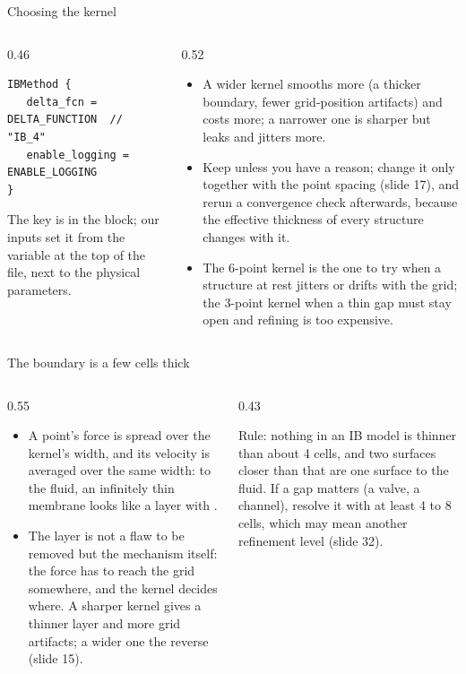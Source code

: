 \documentclass[aspectratio=169,11pt]{beamer}
\begin{document}
\begin{frame}[fragile]{Choosing the kernel}
\begin{columns}[T,onlytextwidth]
\begin{column}{0.46\textwidth}
\begin{lstlisting}[style=input]
IBMethod {
   delta_fcn = DELTA_FUNCTION  // "IB_4"
   enable_logging = ENABLE_LOGGING
}
\end{lstlisting}
\small The key is  in the  block; our inputs set it from the variable  at the top of the file, next to the physical parameters.
\end{column}
\begin{column}{0.52\textwidth}
\small
\begin{itemize}
  \item A wider kernel smooths more (a thicker boundary, fewer grid-position artifacts) and costs more; a narrower one is sharper but leaks and jitters more.
  \item Keep  unless you have a reason; change it only together with the point spacing (slide 17), and rerun a convergence check afterwards, because the effective thickness of every structure changes with it.
  \item The 6-point kernel is the one to try when a structure at rest jitters or drifts with the grid; the 3-point kernel when a thin gap must stay open and refining is too expensive.
\end{itemize}
\end{column}
\end{columns}
\end{frame}

\begin{frame}{The boundary is a few cells thick}
\begin{columns}[T,onlytextwidth]
\begin{column}{0.55\textwidth}
\begin{itemize}
  \item A point's force is spread over the kernel's width, and its velocity is averaged over the same width: to the fluid, an infinitely thin membrane looks like a layer  with .
  \item The layer is not a flaw to be removed but the mechanism itself: the force has to reach the grid somewhere, and the kernel decides where. A sharper kernel gives a thinner layer and more grid artifacts; a wider one the reverse (slide 15).
\end{itemize}
\end{column}
\begin{column}{0.43\textwidth}
\begin{punchbox}
\small Rule: nothing in an IB model is thinner than about 4 cells, and two surfaces closer than that are one surface to the fluid. If a gap matters (a valve, a channel), resolve it with at least 4 to 8 cells, which may mean another refinement level (slide 32).
\end{punchbox}
\end{column}
\end{columns}
\end{frame}
\end{document}
